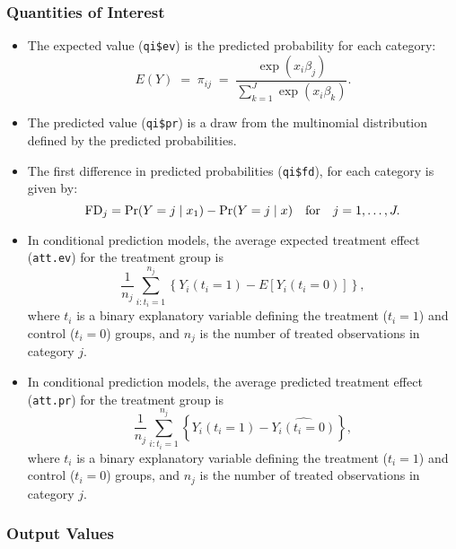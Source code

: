 \subsubsection{Quantities of Interest}

\begin{itemize}
\item The expected value ({\tt qi\$ev}) is the predicted probability
  for each category:
\begin{equation*}
  E(Y) \; = \; \pi_{ij}\; = \; \frac{\exp(x_{i}\beta_{j})}{\sum^{J}_{k = 1}
      \exp(x_{i}\beta_{k})}.
\end{equation*}

\item The predicted value ({\tt qi\$pr}) is a draw from the
  multinomial distribution defined by the predicted probabilities.  

\item The first difference in predicted
  probabilities ({\tt qi\$fd}), for each category is given by:
\begin{equation*}
\textrm{FD}_j = \Pr(Y=j \mid x_1) - \Pr(Y=j \mid x) \quad {\rm for}
\quad j=1,\dots,J.
\end{equation*}

\item In conditional prediction models, the average expected treatment
  effect ({\tt att.ev}) for the treatment group is 
    \begin{equation*} \frac{1}{n_j}\sum_{i:t_i=1}^{n_j} \left\{ Y_i(t_i=1) -
      E[Y_i(t_i=0)] \right\},
    \end{equation*} 
where $t_{i}$ is a binary explanatory variable defining the treatment
($t_{i}=1$) and control ($t_{i}=0$) groups, and $n_j$ is the 
number of treated observations in category $j$.

\item In conditional prediction models, the average predicted treatment
  effect ({\tt att.pr}) for the treatment group is 
    \begin{equation*} \frac{1}{n_j}\sum_{i:t_i=1}^{n_j} \left\{ Y_i(t_i=1) -
      \widehat{Y_i(t_i=0)} \right\},
    \end{equation*} 
where $t_{i}$ is a binary explanatory variable defining the treatment
($t_{i}=1$) and control ($t_{i}=0$) groups, and $n_j$ is the 
number of treated observations in category $j$.
\end{itemize}

\subsubsection{Output Values}

